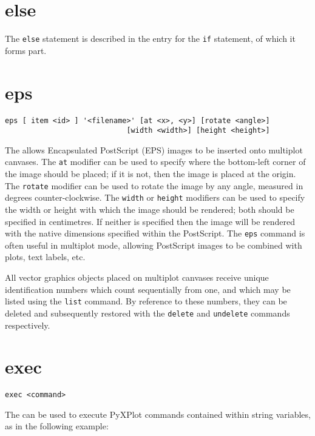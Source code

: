 \section{else}

The {\tt else} statement is described in the entry for the {\tt if}
statement, of which it forms part.


\section{eps}

\begin{verbatim}
eps [ item <id> ] '<filename>' [at <x>, <y>] [rotate <angle>]
                            [width <width>] [height <height>]
\end{verbatim}

The  allows Encapsulated PostScript (EPS) images to be inserted
onto multiplot canvases.  The {\tt at} modifier can be used to specify where
the bottom-left corner of the image should be placed; if it is not, then the
image is placed at the origin. The {\tt rotate} modifier can be used to rotate
the image by any angle, measured in degrees counter-clockwise.  The {\tt width}
or {\tt height} modifiers can be used to specify the width or height with which
the image should be rendered; both should be specified in centimetres. If
neither is specified then the image will be rendered with the native dimensions
specified within the PostScript.  The {\tt eps} command is often useful in
multiplot mode, allowing PostScript images to be combined with plots, text
labels, etc.

All vector graphics objects placed on multiplot canvases receive unique
identification numbers which count sequentially from one, and which may be
listed using the {\tt list} command.  By reference to these numbers, they can
be deleted and subsequently restored with the {\tt delete} and {\tt undelete}
commands respectively.


\section{exec}

\begin{verbatim}
exec <command>
\end{verbatim}

The  can be used to execute PyXPlot commands contained within
string variables, as in the following example:

